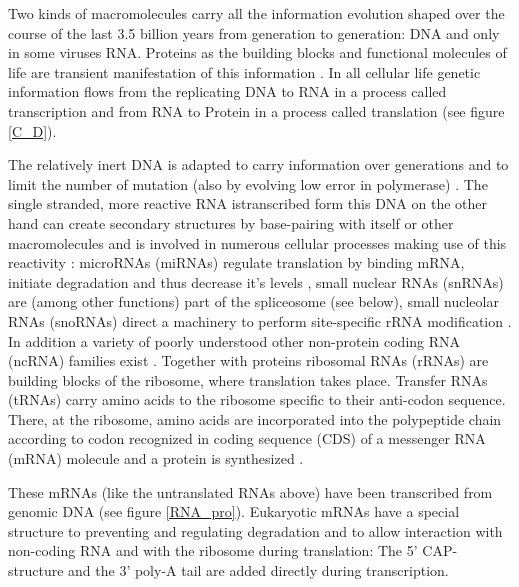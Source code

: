 Two kinds of macromolecules carry all the information evolution shaped
over the course of the last 3.5 billion years from generation to
generation: DNA and only in some viruses RNA. Proteins as the building
blocks and functional molecules of life are transient manifestation of
this information \cite{crick1958biological}. In all cellular life
genetic information flows from the replicating DNA to RNA in a process
called transcription and from RNA to Protein in a process called
translation \cite{pmid5422595} (see figure \ref{C_D}).

The relatively inert DNA is adapted to carry information over
generations and to limit the number of mutation (also by evolving low
error in polymerase) \cite{pmid21821597}. The single stranded, more
reactive RNA istranscribed form this DNA on the other hand can create
secondary structures by base-pairing with itself or other
macromolecules and is involved in numerous cellular processes making
use of this reactivity \cite{pmid21850044}: microRNAs (miRNAs)
regulate translation by binding mRNA, initiate degradation and thus
decrease it's levels \cite{pmid20703300,pmid11679654}, small nuclear
RNAs (snRNAs) are (among other functions) part of the spliceosome (see
below), small nucleolar RNAs (snoRNAs) direct a machinery to perform
site-specific rRNA modification \cite{pmid19446021}. In addition a
variety of poorly understood other non-protein coding RNA (ncRNA)
families exist \cite{pmid16344563}. Together with proteins ribosomal
RNAs (rRNAs) are building blocks of the ribosome, where translation
takes place. Transfer RNAs (tRNAs) carry amino acids to the ribosome
specific to their anti-codon sequence. There, at the ribosome, amino
acids are incorporated into the polypeptide chain according to codon
recognized in coding sequence (CDS) of a messenger RNA (mRNA) molecule
and a protein is synthesized \cite{pmid4887876}.

These mRNAs (like the untranslated RNAs above) have been transcribed
from genomic DNA (see figure \ref{RNA_pro}). Eukaryotic mRNAs have a
special structure to preventing and regulating degradation and to
allow interaction with non-coding RNA and with the ribosome during
translation: The 5' CAP-structure and the 3' poly-A tail are added
directly during transcription.


